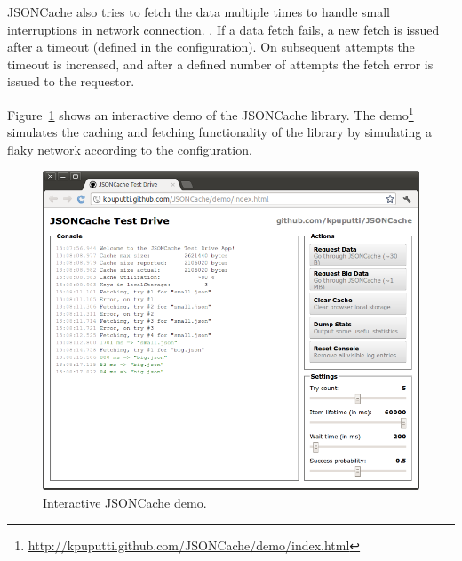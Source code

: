 JSONCache also tries to fetch the data multiple times to handle small
interruptions in network connection. . If a data fetch fails, a new fetch is
issued after a timeout (defined in the configuration). On subsequent
attempts the timeout is increased, and after a defined number of
attempts the fetch error is issued to the requestor.

Figure~\ref{figure:jsoncache-demo.png} shows an interactive demo of
the JSONCache library. The
demo\footnote{\url{http://kpuputti.github.com/JSONCache/demo/index.html}}
simulates the caching and fetching functionality of the library by
simulating a flaky network according to the configuration.

\begin{figure}[ht]
  \begin{center}
    \includegraphics[width=\textwidth]{images/jsoncache-demo.png}
    \caption{Interactive JSONCache demo.}
    \label{figure:jsoncache-demo.png}
  \end{center}
\end{figure}
